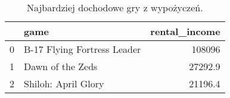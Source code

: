 \begin{table}[h]
\centering
\caption{Najbardziej dochodowe gry z wypożyczeń.}\label{tab:tab3}
\begin{tabular}{rlr}
\hline
    & game                        &   rental\_income \\
\hline
  0 & B-17 Flying Fortress Leader &        108096   \\
  1 & Dawn of the Zeds            &         27292.9 \\
  2 & Shiloh: April Glory         &         21196.4 \\
\hline
\end{tabular}\end{table}